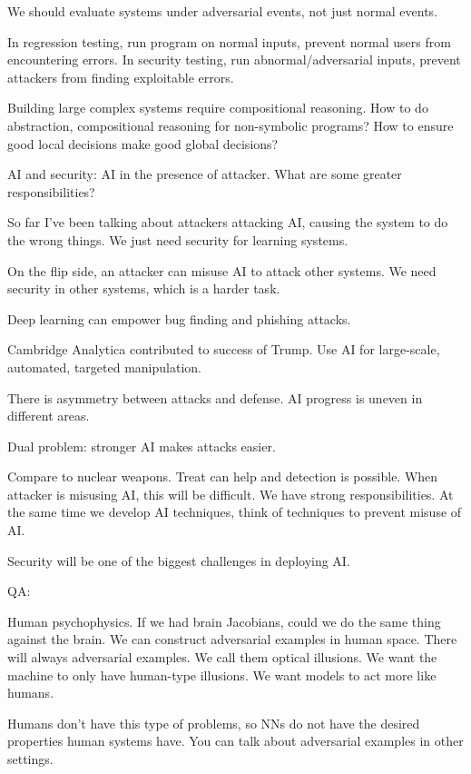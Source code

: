We should evaluate systems under adversarial events, not just normal events.

In regression testing, run program on normal inputs, prevent normal users from encountering errors. In security testing, run abnormal/adversarial inputs, prevent attackers from finding exploitable errors.


Building large complex systems require compositional reasoning. How to do abstraction, compositional reasoning for non-symbolic programs?  How to ensure good local decisions make good global decisions?

AI and security: AI in the presence of attacker. What are some greater responsibilities? 

So far I've been talking about attackers attacking AI, causing the system to do the wrong things.  We just need security for learning systems. 

On the flip side, an attacker can misuse AI to attack other systems. We need security in other systems, which is a harder task.

Deep learning can empower bug finding and phishing attacks.

Cambridge Analytica contributed to success of Trump. Use AI for large-scale, automated, targeted manipulation.

There is asymmetry between attacks and defense. AI progress is uneven in different areas.


Dual problem: stronger AI makes attacks easier.

Compare to nuclear weapons. Treat can help and detection is possible. When attacker is misusing AI, this will be difficult. We have strong responsibilities. At the same time we develop AI techniques, think of techniques to prevent misuse of AI. 

Security will be one of the biggest challenges in deploying AI.

QA:

Human psychophysics. If we had brain Jacobians, could we do the same thing against the brain. We can construct adversarial examples in human space.
There will always adversarial examples. We call them optical illusions. We want the machine to only have human-type illusions. We want models to act more like humans.

Humans don't have this type of problems, so NNs do not have the desired properties human systems have. You can talk about adversarial examples in other settings.